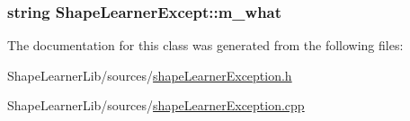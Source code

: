 \subsubsection[{m\+\_\+what}]{\setlength{\rightskip}{0pt plus 5cm}string Shape\+Learner\+Except\+::m\+\_\+what\hspace{0.3cm}{\ttfamily [private]}}\label{class_shape_learner_except_a603590cdc8d3a686cff87a5ce1d5c5f2}


The documentation for this class was generated from the following files\+:\begin{DoxyCompactItemize}
\item 
Shape\+Learner\+Lib/sources/\hyperlink{shape_learner_exception_8h}{shape\+Learner\+Exception.\+h}\item 
Shape\+Learner\+Lib/sources/\hyperlink{shape_learner_exception_8cpp}{shape\+Learner\+Exception.\+cpp}\end{DoxyCompactItemize}
